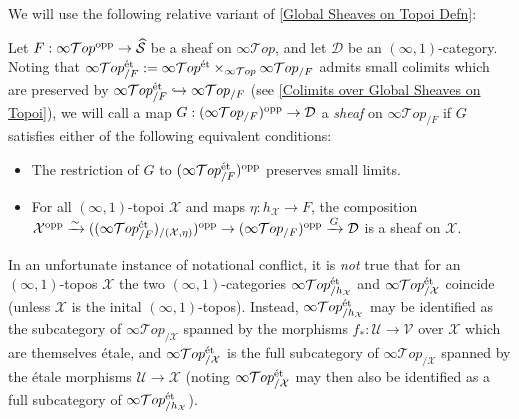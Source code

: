 \documentclass[10pt]{article}
\newcommand{\mS}{\mathcal S}
\newcommand{\cD}{\mathcal{D}}
\newcommand{\cT}{\mathcal{T}}
\newcommand{\cU}{\mathcal{U}} 		%
\newcommand{\cX}{\mathcal{X}}
\theoremstyle{witharg}
\theoremstyle{witharg}
\theoremstyle{witharg2}
\begin{document}
\noindent We will use the following relative variant of \ref{Global Sheaves on Topoi Defn}:

\begin{definition}{}\label{Relative Global Sheaves on Topoi Defn}

    Let $F:\infty\cT op^{\textnormal{opp}}\rightarrow \widehat{\mS}$ be a sheaf on $\infty\cT op$, and let $\cD$ be an $(\infty,1)$-category. Noting that $\infty\cT op^{\textnormal{\'{e}t}}_{/F}:=\infty\cT op^{\textnormal{\'{e}t}}\times_{\infty\cT op}\infty\cT op_{/F}$ admits small colimits which are preserved by $\infty\cT op^{\textnormal{\'{e}t}}_{/F}\hookrightarrow \infty\cT op_{/F}$ (see \ref{Colimits over Global Sheaves on Topoi}), we will call a map $G:(\infty\cT op_{/F})^{\textnormal{opp}}\rightarrow \cD$ a \emph{sheaf} on $\infty\cT op_{/F}$ if $G$ satisfies either of the following equivalent conditions:

    \begin{itemize}
    
        \item [$(1)$] The restriction of $G$ to $(\infty\cT op^{\textnormal{\'{e}t}}_{/F})^\textnormal{opp}$ preserves small limits.

        \item [$(2)$] For all $(\infty,1)$-topoi $\cX$ and maps $\eta:h_\cX\rightarrow F$, the composition $\cX^{\textnormal{opp}}\xrightarrow{\sim}((\infty\cT op^{\textnormal{\'{e}t}}_{/F})_{/(\cX,\eta)})^{\textnormal{opp}}\rightarrow (\infty\cT op_{/F})^{\textnormal{opp}}\xrightarrow{G}\cD$ is a sheaf on $\cX$.
        
    \end{itemize}
    
\end{definition}


\begin{remark}{}\label{Notation Conflict For Global Sheaves on Topoi}

    In an unfortunate instance of notational conflict, it is \emph{not} true that for an $(\infty,1)$-topos $\cX$ the two $(\infty,1)$-categories $\infty\cT op^{\textnormal{\'{e}t}}_{/h_\cX}$ and $\infty\cT op^{\textnormal{\'{e}t}}_{/\cX}$ coincide (unless $\cX$ is the inital $(\infty,1)$-topos). Instead, $\infty\cT op^{\textnormal{\'{e}t}}_{/h_\cX}$ may be identified as the subcategory of $\infty\cT op_{/\cX}$ spanned by the morphisms $f_*:\cU\rightarrow \mathcal{V}$ over $\cX$ which are themselves \'{e}tale, and $\infty\cT op^{\textnormal{\'{e}t}}_{/\cX}$ is the full subcategory of $\infty\cT op_{/\cX}$ spanned by the \'{e}tale morphisms $\cU\rightarrow \cX$ (noting $\infty\cT op^{\textnormal{\'{e}t}}_{/\cX}$ may then also be identified as a full subcategory of $\infty\cT op^{\textnormal{\'{e}t}}_{/h_\cX}$). 
    
\end{remark}
\end{document}
